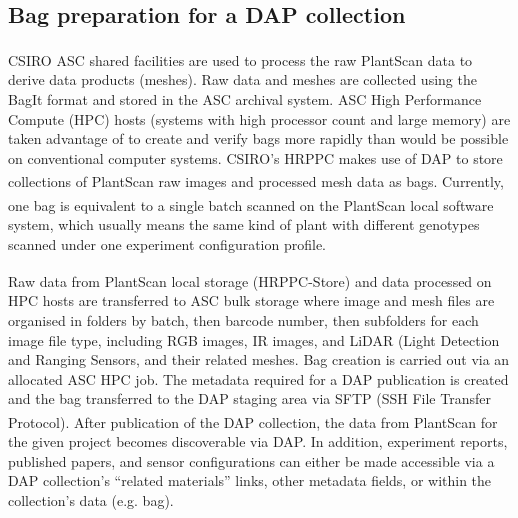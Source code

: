 \documentclass{llncs}
\begin{document}
\subsection{Bag preparation for a DAP collection}


CSIRO ASC shared facilities \cite{ASC} are used to process the raw
PlantScan\textsuperscript{\texttrademark} data to derive data products (meshes).
Raw data and meshes are collected using the BagIt format \cite{Kunze2011} and
stored in the ASC archival system. ASC High Performance Compute (HPC) hosts
(systems with high processor count and large memory) are taken advantage of to
create and verify bags more rapidly than would be possible on conventional
computer systems. 
CSIRO's HRPPC makes use of DAP to store collections of PlantScan\textsuperscript{\texttrademark} raw images and processed mesh data as bags.
Currently, one bag is equivalent to
a single batch scanned on the
PlantScan\textsuperscript{\texttrademark}
local software system, which usually means the same kind of plant with different
genotypes scanned under one  experiment configuration profile.  


Raw data from
PlantScan\textsuperscript{\texttrademark} 
local storage (HRPPC-Store) and data processed on HPC hosts are transferred to
ASC bulk storage where image and mesh files are organised in folders by batch,
then barcode number, then subfolders for each image file type, including RGB images,
IR images, and LiDAR (Light Detection and
Ranging Sensors, and their related meshes. Bag creation is carried out via an allocated ASC HPC job.
The metadata required for a DAP publication is created and the bag transferred
to the DAP staging area via SFTP (SSH File Transfer Protocol). After publication
of the DAP collection, the data from PlantScan\textsuperscript{\texttrademark}
for the given project becomes
discoverable via DAP. In addition, experiment reports, published papers, and
sensor configurations can either be made accessible via a DAP collection's
``related materials'' links, other metadata fields, or within the collection's
data (e.g. bag).
\end{document}
